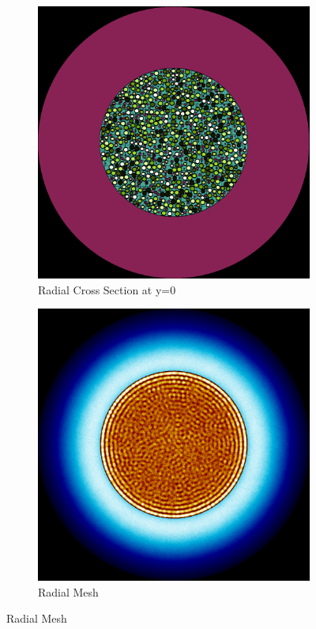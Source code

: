 \begin{figure}[H]
\centering

\begin{subfigure}{0.45\textwidth}
  \includegraphics[width=0.95\linewidth]{figures/1234560/1234560-r}
  \caption{Radial Cross Section at y=0}
  \label{fig:1234560-r}
\end{subfigure}%
%
\begin{subfigure}{0.45\textwidth}
  \includegraphics[width=0.95\linewidth]{figures/1234560/1234560-rm}
  \caption{Radial Mesh}
  \label{fig:1234560-rm}
\end{subfigure}


\end{figure}
